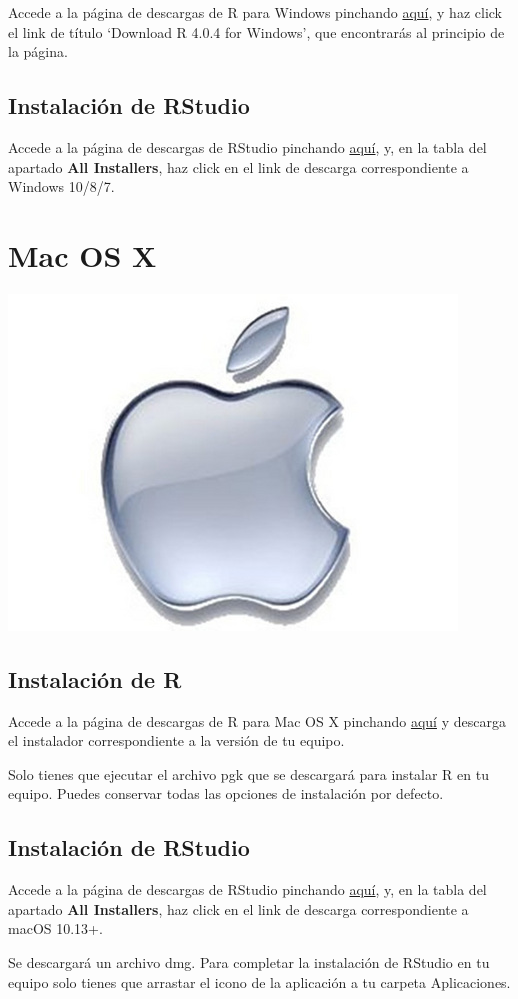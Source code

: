 \documentclass[
  degree=mecinf,
  title=normal,
  toc=normal,
  bib=normal]{mnye}
\begin{document}
Accede a la página de descargas de R para Windows pinchando \href{https://ftp.cixug.es/CRAN/bin/windows/base/}{aquí}, y haz click el link de título `Download R 4.0.4 for Windows', que encontrarás al principio de la página.

\hypertarget{instalaciuxf3n-de-rstudio-1}{%
\subsection{Instalación de RStudio}\label{instalaciuxf3n-de-rstudio-1}}

Accede a la página de descargas de RStudio pinchando \href{https://rstudio.com/products/rstudio/download/\#download}{aquí}, y, en la tabla del apartado \textbf{All Installers}, haz click en el link de descarga correspondiente a Windows 10/8/7.

\hypertarget{mac}{%
\section{Mac OS X}\label{mac}}

\begin{center}\includegraphics[width=0.15\linewidth]{images/os/apple} \end{center}

\hypertarget{instalaciuxf3n-de-r-2}{%
\subsection{Instalación de R}\label{instalaciuxf3n-de-r-2}}

Accede a la página de descargas de R para Mac OS X pinchando \href{https://ftp.cixug.es/CRAN/bin/macosx/}{aquí} y descarga el instalador correspondiente a la versión de tu equipo.

Solo tienes que ejecutar el archivo pgk que se descargará para instalar R en tu equipo. Puedes conservar todas las opciones de instalación por defecto.

\hypertarget{instalaciuxf3n-de-rstudio-2}{%
\subsection{Instalación de RStudio}\label{instalaciuxf3n-de-rstudio-2}}

Accede a la página de descargas de RStudio pinchando \href{https://rstudio.com/products/rstudio/download/\#download}{aquí}, y, en la tabla del apartado \textbf{All Installers}, haz click en el link de descarga correspondiente a macOS 10.13+.

Se descargará un archivo dmg. Para completar la instalación de RStudio en tu equipo solo tienes que arrastar el icono de la aplicación a tu carpeta Aplicaciones.

\end{document}
